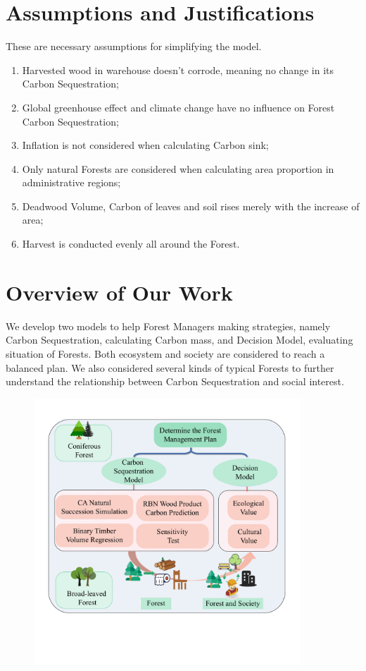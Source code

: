 \documentclass{mcmthesis}
\numberwithin{figure}{section}
\numberwithin{table}{section}
\numberwithin{equation}{section}
\begin{document}
\section{Assumptions and Justifications}
These are necessary assumptions for simplifying the model.
\begin{enumerate}
  \item Harvested wood in warehouse doesn't corrode, meaning no change in its Carbon Sequestration;
  \item Global greenhouse effect and climate change have no influence on Forest Carbon Sequestration;
  \item Inflation is not considered when calculating Carbon sink;
  \item Only natural Forests are considered when calculating area proportion in administrative regions;
  \item Deadwood Volume, Carbon of leaves and soil rises merely with the increase of area;
  \item Harvest is conducted evenly all around the Forest.
\end{enumerate}
\section{Overview of Our Work}

We develop two models to help Forest Managers making strategies, namely Carbon Sequestration, 
calculating Carbon mass, and Decision Model, evaluating situation of Forests. Both 
ecosystem and society are considered to reach a balanced plan. We also considered
several kinds of typical Forests to further understand the relationship between
Carbon Sequestration and social interest.


\begin{figure}[htbp]
  \centering
  \includegraphics[width = 10cm]{code&pic/框架图.pdf}
\end{figure}
\end{document}
